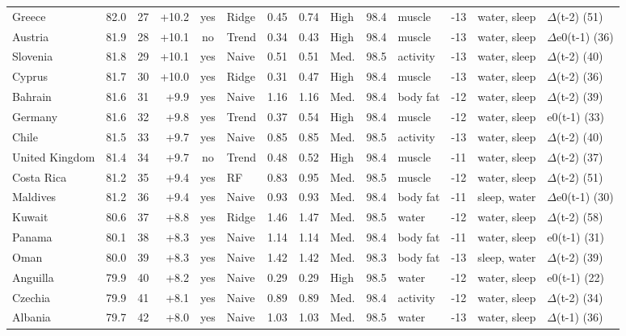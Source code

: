 {\begin{longtable}{l r r r c l r r l r l r l l}
Greece & 82.0 & 27 & +10.2 & yes & Ridge & 0.45 & 0.74 & High & 98.4 & muscle & -13 & water, sleep & $\Delta$(t-2) (51) \\
Austria & 81.9 & 28 & +10.1 & no & Trend & 0.34 & 0.43 & High & 98.4 & muscle & -13 & water, sleep & $\Delta$e0(t-1) (36) \\
Slovenia & 81.8 & 29 & +10.1 & yes & Naive & 0.51 & 0.51 & Med. & 98.5 & activity & -13 & water, sleep & $\Delta$(t-2) (40) \\
Cyprus & 81.7 & 30 & +10.0 & yes & Ridge & 0.31 & 0.47 & High & 98.4 & muscle & -13 & water, sleep & $\Delta$(t-2) (36) \\
Bahrain & 81.6 & 31 & +9.9 & yes & Naive & 1.16 & 1.16 & Med. & 98.4 & body fat & -12 & water, sleep & $\Delta$(t-2) (39) \\
Germany & 81.6 & 32 & +9.8 & yes & Trend & 0.37 & 0.54 & High & 98.4 & muscle & -12 & water, sleep & e0(t-1) (33) \\
Chile & 81.5 & 33 & +9.7 & yes & Naive & 0.85 & 0.85 & Med. & 98.5 & activity & -13 & water, sleep & $\Delta$(t-2) (40) \\
United Kingdom & 81.4 & 34 & +9.7 & no & Trend & 0.48 & 0.52 & High & 98.4 & muscle & -11 & water, sleep & $\Delta$(t-2) (37) \\
Costa Rica & 81.2 & 35 & +9.4 & yes & RF & 0.83 & 0.95 & Med. & 98.5 & muscle & -12 & water, sleep & $\Delta$(t-2) (51) \\
Maldives & 81.2 & 36 & +9.4 & yes & Naive & 0.93 & 0.93 & Med. & 98.4 & body fat & -11 & sleep, water & $\Delta$e0(t-1) (30) \\
Kuwait & 80.6 & 37 & +8.8 & yes & Ridge & 1.46 & 1.47 & Med. & 98.5 & water & -12 & water, sleep & $\Delta$(t-2) (58) \\
Panama & 80.1 & 38 & +8.3 & yes & Naive & 1.14 & 1.14 & Med. & 98.4 & body fat & -11 & water, sleep & e0(t-1) (31) \\
Oman & 80.0 & 39 & +8.3 & yes & Naive & 1.42 & 1.42 & Med. & 98.3 & body fat & -13 & sleep, water & $\Delta$(t-2) (39) \\
Anguilla & 79.9 & 40 & +8.2 & yes & Naive & 0.29 & 0.29 & High & 98.5 & water & -12 & water, sleep & e0(t-1) (22) \\
Czechia & 79.9 & 41 & +8.1 & yes & Naive & 0.89 & 0.89 & Med. & 98.4 & activity & -12 & water, sleep & $\Delta$(t-2) (34) \\
Albania & 79.7 & 42 & +8.0 & yes & Naive & 1.03 & 1.03 & Med. & 98.5 & water & -13 & water, sleep & $\Delta$(t-1) (36) \\

\end{longtable}}
